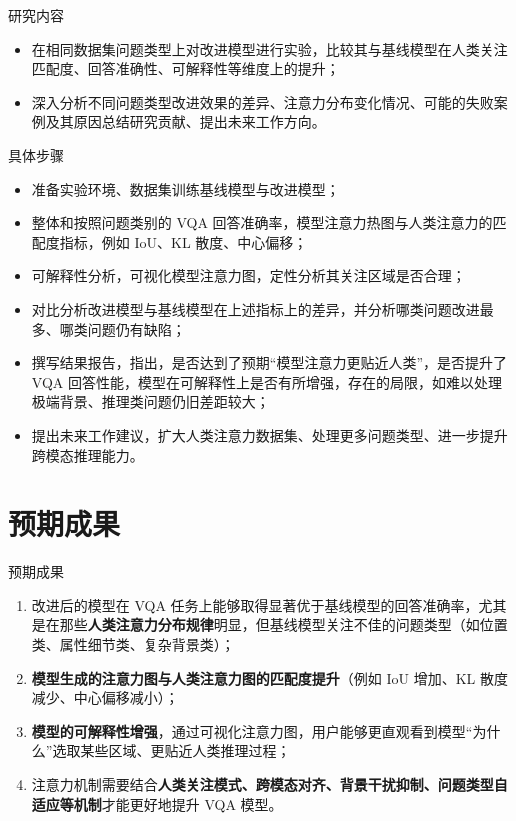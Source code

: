 \documentclass{beamer}
\begin{document}
\begin{frame}{研究内容}
    \begin{itemize}
        \item 在相同数据集问题类型上对改进模型进行实验，比较其与基线模型在人类关注匹配度、回答准确性、可解释性等维度上的提升；
        \item 深入分析不同问题类型改进效果的差异、注意力分布变化情况、可能的失败案例及其原因总结研究贡献、提出未来工作方向。
    \end{itemize}
\end{frame}

\begin{frame}{具体步骤}
    \begin{itemize}
        \item 准备实验环境、数据集训练基线模型与改进模型；
        \item 整体和按照问题类别的 VQA 回答准确率，模型注意力热图与人类注意力的匹配度指标，例如 IoU、KL 散度、中心偏移；
        \item 可解释性分析，可视化模型注意力图，定性分析其关注区域是否合理；
        \item 对比分析改进模型与基线模型在上述指标上的差异，并分析哪类问题改进最多、哪类问题仍有缺陷；
        \item 撰写结果报告，指出，是否达到了预期“模型注意力更贴近人类”，是否提升了 VQA 回答性能，模型在可解释性上是否有所增强，存在的局限，如难以处理极端背景、推理类问题仍旧差距较大；
        \item 提出未来工作建议，扩大人类注意力数据集、处理更多问题类型、进一步提升跨模态推理能力。
    \end{itemize}
\end{frame}



\section{预期成果}

\begin{frame}{预期成果}
    \begin{enumerate}
        \item 改进后的模型在 VQA 任务上能够取得显著优于基线模型的回答准确率，尤其是在那些\textcolor{deepred}{\textbf{人类注意力分布规律}}明显，但基线模型关注不佳的问题类型（如位置类、属性细节类、复杂背景类）；
        \item \textcolor{deepred}{\textbf{模型生成的注意力图与人类注意力图的匹配度提升}}（例如 IoU 增加、KL 散度减少、中心偏移减小）；
        \item \textcolor{deepred}{\textbf{模型的可解释性增强}}，通过可视化注意力图，用户能够更直观看到模型“为什么”选取某些区域、更贴近人类推理过程；
        \item 注意力机制需要结合\textcolor{deepred}{\textbf{人类关注模式、跨模态对齐、背景干扰抑制、问题类型自适应等机制}}才能更好地提升 VQA 模型。
    \end{enumerate}    
\end{frame}



\end{document}
